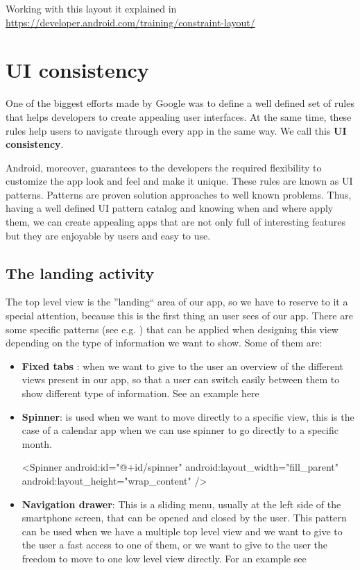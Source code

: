 Working with this layout it explained in \url{https://developer.android.com/training/constraint-layout/}

\section{UI consistency}
One of the biggest efforts made by Google was to define a well defined set of rules that helps developers to create appealing user interfaces. At the same time, these rules help users to navigate through every app in the same way. We call this\textbf{ UI consistency}.

Android, moreover, guarantees to the developers the required flexibility to customize the app look and feel and make it unique.
These rules are known as UI patterns. Patterns are proven solution approaches to well known problems. Thus, having a well
defined UI pattern catalog and knowing when and where apply them, we can create appealing apps that are not only full of
interesting features but they are enjoyable by users and easy to use.

\subsection{The landing activity}
The top level view is the ''landing`` area of our app, so we have to reserve to it a special attention, because this is the first
thing an user sees of our app. There are some specific patterns (see e.g. \cite{Google2017c}) that can be applied when designing this view depending on the type of information we want to show. Some of them are:

\begin{itemize}
	\item \textbf{Fixed tabs} : when we want to give to
	the user an overview of the different views present in our app, so that a user can switch easily between them to show different type of information. See an example here \cite{Tamada2013}
	
	\item \textbf{Spinner}: is used when we want to move directly to a specific view, this is the case of a calendar app when we can use spinner to go directly to a specific month.
	
	\begin{xml}
		<Spinner
		android:id="@+id/spinner"
		android:layout_width="fill_parent"
		android:layout_height="wrap_content" />
	\end{xml}
	
	\item \textbf{Navigation drawer}: This is a sliding menu, usually at the left side of the
	smartphone screen, that can be opened and closed by the user. This pattern can be used when we have a multiple top level view
	and we want to give to the user a fast access to one of them, or we want to give to the user the freedom to move to one low level
	view directly. For an example see  \cite{Google2017a}
\end{itemize}

